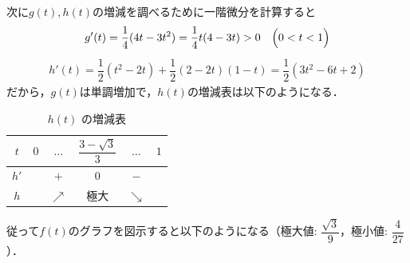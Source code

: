 \documentclass[../../main.tex]{subfiles}
\begin{document}
次に$g(t), h(t)$の増減を調べるために一階微分を計算すると
\begin{align}
  g'(t) = \dfrac{1}{4}(4t - 3t^2) = \dfrac{1}{4}t(4-3t) > 0 \quad \Bigl(0 < t < 1\Bigr)
\end{align}
\begin{align}
  h'(t) = \dfrac{1}{2}(t^2 - 2t) + \dfrac{1}{2}(2 - 2t)(1-t) = \dfrac{1}{2}(3t^2 - 6t + 2)
\end{align}
だから，$g(t)$は単調増加で，$h(t)$の増減表は以下のようになる．

\begin{table}[htb]
  \centering
  \caption{$h(t)$ の増減表}
  \begin{tabular}{c|ccccc}
    $t$ & $0$ & $\dots$ & $\dfrac{3-\sqrt{3}}{3}$ & $\dots$ & $1$ \\
    \hline
    $h'$ & & $+$ & $0$ & $-$ & \\
    \hline
    $h$ & & $\nearrow$ & 極大 & $\searrow$ &
  \end{tabular}
\end{table}

従って$f(t)$のグラフを図示すると以下のようになる（極大値: $\dfrac{\sqrt{3}}{9}$，極小値: $\dfrac{4}{27}$）．
\end{document}

